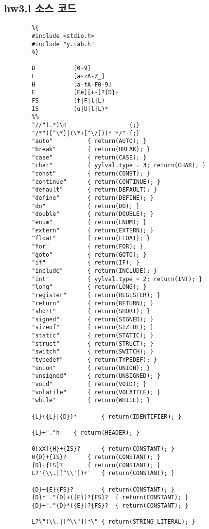 \documentclass{article}
\begin{document}
\subsection{hw3.l 소스 코드}
\begin{lstlisting}
		%{
		#include <stdio.h>
		#include "y.tab.h"
		%}
		
		D			[0-9]
		L			[a-zA-Z_]
		H			[a-fA-F0-9]
		E			[Ee][+-]?{D}+
		FS			(f|F|l|L)
		IS			(u|U|l|L)*
		%%
		"//"(.*)\n 					{;}
		"/*"([^\*]|(\*+[^\/]))*"*/" {;}
		"auto"			{ return(AUTO); }
		"break"			{ return(BREAK); }
		"case"			{ return(CASE); }
		"char"			{ yylval.type = 3; return(CHAR); }
		"const"			{ return(CONST); }
		"continue"		{ return(CONTINUE); }
		"default"		{ return(DEFAULT); }
		"define"		{ return(DEFINE); }
		"do"			{ return(DO); }
		"double"		{ return(DOUBLE); }
		"enum"			{ return(ENUM); }
		"extern"		{ return(EXTERN); }
		"float"			{ return(FLOAT); }
		"for"			{ return(FOR); }
		"goto"			{ return(GOTO); }
		"if"			{ return(IF); }
		"include"		{ return(INCLUDE); }
		"int"			{ yylval.type = 2; return(INT); }
		"long"			{ return(LONG); }
		"register"		{ return(REGISTER); }
		"return"		{ return(RETURN); }
		"short"			{ return(SHORT); }
		"signed"		{ return(SIGNED); }
		"sizeof"		{ return(SIZEOF); }
		"static"		{ return(STATIC); }
		"struct"		{ return(STRUCT); }
		"switch"		{ return(SWITCH); }
		"typedef"		{ return(TYPEDEF); }
		"union"			{ return(UNION); }
		"unsigned"		{ return(UNSIGNED); }
		"void"			{ return(VOID); }
		"volatile"		{ return(VOLATILE); }
		"while"			{ return(WHILE); }
		
		{L}({L}|{D})*		{ return(IDENTIFIER); }
		
		{L}+"."h	{ return(HEADER); }
		
		0[xX]{H}+{IS}?		{ return(CONSTANT); }
		0{D}+{IS}?		{ return(CONSTANT); }
		{D}+{IS}?		{ return(CONSTANT); }
		L?'(\\.|[^\\'])+'	{ return(CONSTANT); }
		
		{D}+{E}{FS}?		{ return(CONSTANT); }
		{D}*"."{D}+({E})?{FS}?	{ return(CONSTANT); }
		{D}+"."{D}*({E})?{FS}?	{ return(CONSTANT); }
		
		L?\"(\\.|[^\\"])*\"	{ return(STRING_LITERAL); }
		

\end{lstlisting}
\end{document}
